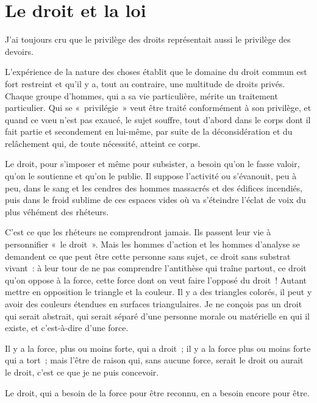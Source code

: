 \documentclass[french,twoside]{book} %
\newcommand{\astermono}{\medskip\centerline{\color{rubric}\large\selectfont{\syms ✻}}\medskip\par}%
\begin{document}
\section[{Le droit et la loi}]{Le droit et la loi}
\noindent J’ai toujours cru que le privilège des droits représentait aussi le privilège des devoirs.\par

\astermono

\noindent L’expérience de la nature des choses établit que le domaine du droit commun est fort restreint et qu’il y a, tout au contraire, une multitude de droits privés. Chaque groupe d’hommes, qui a sa vie particulière, mérite un traitement particulier. Qui se « privilégie » veut être traité conformément à son privilège, et quand ce vœu n’est pas exaucé, le sujet souffre, tout d’abord dans le corps dont il fait partie et secondement en lui-même, par suite de la déconsidération et du relâchement qui, de toute nécessité, atteint ce corps.\par

\astermono

\noindent Le droit, pour s’imposer et même pour subsister, a besoin qu’on le fasse valoir, qu’on le soutienne et qu’on le publie. Il suppose l’activité ou s’évanouit, peu à peu, dans le sang et les cendres des hommes massacrés et des édifices incendiés, puis dans le froid sublime de ces espaces vides où va s’éteindre l’éclat de voix du plus véhément des rhéteurs.\par
C’est ce que les rhéteurs ne comprendront jamais. Ils passent leur vie à personnifier « le droit ». Mais les hommes d’action et les hommes d’analyse se demandent ce que peut être cette personne sans sujet, ce droit sans substrat vivant : à leur tour de ne pas comprendre l’antithèse qui traîne partout, ce droit qu’on oppose à la force, cette force dont on veut faire l’opposé du droit ! Autant mettre en opposition le triangle et la couleur. Il y a des triangles colorés, il peut y avoir des couleurs étendues en surfaces triangulaires. Je ne conçois pas un droit qui serait abstrait, qui serait séparé d’une personne morale ou matérielle en qui il existe, et c’est-à-dire d’une force.\par
Il y a la force, plus ou moins forte, qui a droit ; il y a la force plus ou moins forte qui a tort ; mais l’être de raison qui, sans aucune force, serait le droit ou aurait le droit, c’est ce que je ne puis concevoir.\par
Le droit, qui a besoin de la force pour être reconnu, en a besoin encore pour être.\par
\end{document}
